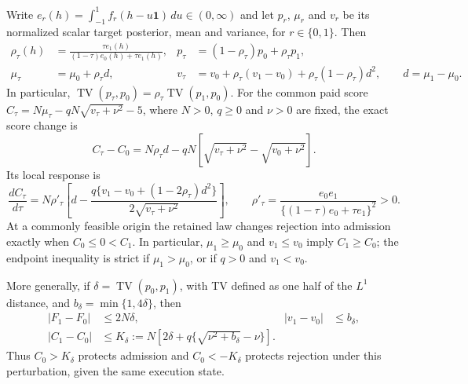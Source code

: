 \begin{proposition}
\label{prop:retained-pairing-paid-bridge}
Write $e_r(h)=\int_{-1}^{1}f_r(h-u\mathbf1)\,du\in(0,\infty)$ and
let $p_r$, $\mu_r$ and $v_r$ be its normalized scalar target posterior,
mean and variance, for $r\in\{0,1\}$.  Then
\begin{align}
 \rho_\tau(h)&=\frac{\tau e_1(h)}{(1-\tau)e_0(h)+\tau e_1(h)},
 &p_\tau&=(1-\rho_\tau)p_0+\rho_\tau p_1,
 \label{eq:retained-bridge-posterior}\\
 \mu_\tau&=\mu_0+\rho_\tau d,
 &v_\tau&=v_0+\rho_\tau(v_1-v_0)+\rho_\tau(1-\rho_\tau)d^2,
 \qquad d=\mu_1-\mu_0.
 \label{eq:retained-bridge-moments}
\end{align}
In particular, $\operatorname{TV}(p_\tau,p_0)=
\rho_\tau\operatorname{TV}(p_1,p_0)$.
For the common paid score $C_\tau=N\mu_\tau-qN\sqrt{v_\tau+\nu^2}-5$,
where $N>0$, $q\geq0$ and $\nu>0$ are fixed, the exact score change is
\begin{equation}
 C_\tau-C_0=N\rho_\tau d-qN
 \left[\sqrt{v_\tau+\nu^2}-\sqrt{v_0+\nu^2}\right].
 \label{eq:retained-bridge-paid-score}
\end{equation}
Its local response is
\begin{equation}
 \frac{dC_\tau}{d\tau}=N\rho'_\tau
 \left[d-\frac{q\{v_1-v_0+(1-2\rho_\tau)d^2\}}
 {2\sqrt{v_\tau+\nu^2}}\right],\qquad
 \rho'_\tau=\frac{e_0e_1}{\{(1-\tau)e_0+\tau e_1\}^2}>0.
 \label{eq:retained-bridge-score-response}
\end{equation}
At a commonly feasible origin the retained law changes rejection into
admission exactly when $C_0\leq0<C_1$.  In particular,
$\mu_1\geq\mu_0$ and $v_1\leq v_0$ imply $C_1\geq C_0$; the endpoint
inequality is strict if $\mu_1>\mu_0$, or if $q>0$ and $v_1<v_0$.

More generally, if $\delta=\operatorname{TV}(p_0,p_1)$, with TV defined
as one half of the $L^1$ distance, and $b_\delta=\min\{1,4\delta\}$, then
\begin{align}
 |F_1-F_0|&\leq2N\delta,
 &|v_1-v_0|&\leq b_\delta,\nonumber\\
 |C_1-C_0|&\leq K_\delta
 :=N\left[2\delta+q\{\sqrt{\nu^2+b_\delta}-\nu\}\right].
 \label{eq:retained-bridge-score-tv}
\end{align}
Thus $C_0>K_\delta$ protects admission and $C_0<-K_\delta$ protects
rejection under this perturbation, given the same execution state.
\end{proposition}
